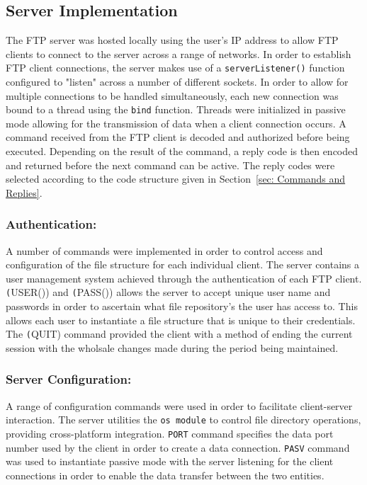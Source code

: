 \documentclass[10pt, conference]{IEEEtran}
\begin{document}
\subsection{Server Implementation}
\label{sec: Server Implementation}
The FTP server was hosted locally using the user's IP address to allow FTP clients to connect to the server across a range of networks. In order to establish FTP client connections, the server makes use of a \texttt{serverListener()} function configured to "listen" across a number of different sockets. In order to allow for multiple connections to be handled simultaneously, each new connection was bound to a thread using the \texttt{bind} function. Threads were initialized in passive mode allowing for the transmission of data when a client connection occurs. A command received from the FTP client is decoded and authorized before being executed. Depending on the result of the command, a reply code is then encoded and returned before the next command can be active. The reply codes were selected according to the code structure given in Section~\ref{sec: Commands and Replies}.

\subsubsection{Authentication:}
A number of commands were implemented in order to control access and configuration of the file structure for each individual client. The server contains a user management system achieved through the authentication of each FTP client. \texttt(USER()) and \texttt(PASS()) allows the server to accept unique user name and passwords in order to ascertain what file repository's the user has access to. This allows each user to instantiate a file structure that is unique to their credentials. The \texttt(QUIT) command provided the client with a method of ending the current session with the wholsale changes made during the period being maintained.

\subsubsection{Server Configuration:}
A range of configuration commands were used in order to facilitate client-server interaction. The server utilities the \texttt{os module} to control file directory operations, providing cross-platform integration\cite{os}. \texttt{PORT} command specifies the data port number used by the client in order to create a data connection. \texttt{PASV} command was used to instantiate passive mode with the server listening for the client connections in order to enable the data transfer between the two entities.
\end{document}
